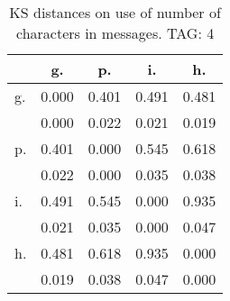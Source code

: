 \begin{table}[h!]
\begin{center}
\begin{tabular}{| l | c | c | c | c |}\hline
 & g. & p. & i. & h. \\\hline
g. & 0.000  & 0.401  & 0.491  & 0.481 \\\hline
 & 0.000  & 0.022  & 0.021  & 0.019 \\\hline
p. & 0.401  & 0.000  & 0.545  & 0.618 \\\hline
 & 0.022  & 0.000  & 0.035  & 0.038 \\\hline
i. & 0.491  & 0.545  & 0.000  & 0.935 \\\hline
 & 0.021  & 0.035  & 0.000  & 0.047 \\\hline
h. & 0.481  & 0.618  & 0.935  & 0.000 \\\hline
 & 0.019  & 0.038  & 0.047  & 0.000 \\\hline
\end{tabular}
\caption{KS distances on use of number of characters in messages. TAG: 4}
\end{center}
\end{table}